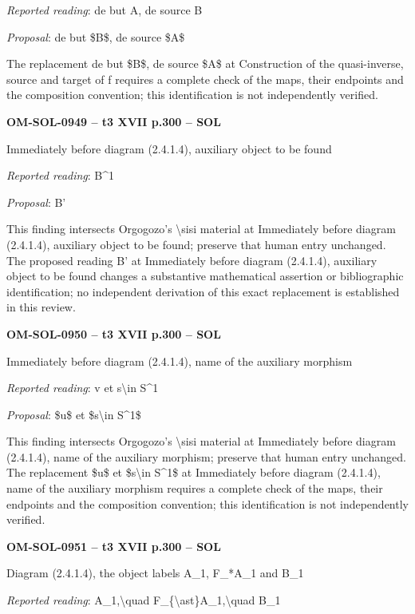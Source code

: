 \emph{Reported reading}: de but A, de source B\par
\emph{Proposal}: de but \$B\$, de source \$A\$\par
The replacement de but \$B\$, de source \$A\$ at Construction of the quasi-inverse, source and target of f requires a complete check of the maps, their endpoints and the composition convention; this identification is not independently verified.\par
\par\noindent\textbf{OM-SOL-0949 -- t3 XVII p.300 -- SOL}\par
Immediately before diagram (2.4.1.4), auxiliary object to be found\par
\emph{Reported reading}: B\textasciicircum{}1\par
\emph{Proposal}: B'\par
This finding intersects Orgogozo's \textbackslash{}sisi material at Immediately before diagram (2.4.1.4), auxiliary object to be found; preserve that human entry unchanged. The proposed reading B' at Immediately before diagram (2.4.1.4), auxiliary object to be found changes a substantive mathematical assertion or bibliographic identification; no independent derivation of this exact replacement is established in this review.\par
\par\noindent\textbf{OM-SOL-0950 -- t3 XVII p.300 -- SOL}\par
Immediately before diagram (2.4.1.4), name of the auxiliary morphism\par
\emph{Reported reading}: v et s\textbackslash{}in S\textasciicircum{}1\par
\emph{Proposal}: \$u\$ et \$s\textbackslash{}in S\textasciicircum{}1\$\par
This finding intersects Orgogozo's \textbackslash{}sisi material at Immediately before diagram (2.4.1.4), name of the auxiliary morphism; preserve that human entry unchanged. The replacement \$u\$ et \$s\textbackslash{}in S\textasciicircum{}1\$ at Immediately before diagram (2.4.1.4), name of the auxiliary morphism requires a complete check of the maps, their endpoints and the composition convention; this identification is not independently verified.\par
\par\noindent\textbf{OM-SOL-0951 -- t3 XVII p.300 -- SOL}\par
Diagram (2.4.1.4), the object labels A\_1, F\_*A\_1 and B\_1\par
\emph{Reported reading}: A\_1,\textbackslash{}quad F\_\{\textbackslash{}ast\}A\_1,\textbackslash{}quad B\_1\par
